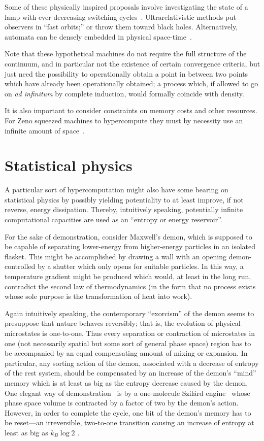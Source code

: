 \documentclass[10pt]{article}
\begin{document}
Some of these physically inspired proposals
involve investigating the state of a lamp with ever decreasing switching cycles~\cite{thom:54}.
Ultrarelativistic methods put observers in ``fast orbits;'' or throw them toward
black holes.
Alternatively, automata can  be densely embedded in physical space-time~\cite{2008-sica}.

Note that these hypothetical machines do not require the full structure of the continuum,
and in particular not the existence of certain convergence criteria, but just need the possibility to operationally
obtain a point in between two points which have already been operationally obtained; a process which,
if allowed to go on {\it ad infinitum} by complete induction, would formally coincide with density.

It is also important to consider constraints on memory costs and other resources.
For Zeno squeezed machines to hypercompute they must by necessity use an infinite amount of space~\cite{calude-staiger-09}.

\section{Statistical physics}

A particular sort of hypercomputation might also have some bearing on statistical physics by possibly yielding potentiality to at least
improve, if not reverse, energy dissipation. Thereby, intuitively speaking, potentially infinite computational capacities are used as an ``entropy or energy reservoir''.

For the sake of demonstration, consider Maxwell's demon,
which is supposed to be capable of separating lower-energy from higher-energy particles in an isolated flasket.
This might be accomplished by drawing a wall with an opening demon-controlled by a shutter which only opens for suitable particles.
In this way, a temperature gradient might be produced which would, at least in the long run, contradict the second law of thermodynamics
(in the form that no process exists whose sole purpose is the transformation of heat into work).

Again intuitively speaking, the contemporary ``exorcism'' of the demon seems to presuppose that nature behaves reversibly;
that is, the evolution of physical microstates is one-to-one.
Thus every separation or contraction of microstates in one (not necessarily spatial but some sort of general phase space) region
has to be accompanied by an equal compensating amount of mixing or expansion.
In particular, any sorting action of the demon,
associated with a decrease of entropy of the rest system,
should be compensated by an increase of the demon's ``mind'' memory which is at least as big as the entropy decrease caused by the demon.
One elegant way of demonstration~\cite[pp.~927-929]{bennett-82} is by a one-molecule Szil\'ard engine~\cite[pp.~843--844]{Szilard-1929}
whose phase space volume is contracted by a factor of two by the demon's action.
However, in order to complete the cycle, one bit of the demon's memory has to be reset---an irreversible, two-to-one transition causing an increase
of entropy at least as big as  $k_B \log 2$ .
\end{document}
